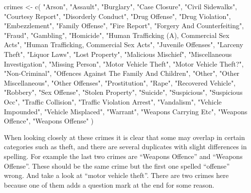\documentclass[
]{krantz}
\makeatletter
\newenvironment{Shaded}{\begin{snugshade}}{\end{snugshade}}
\newcommand{\FunctionTok}[1]{\textcolor[rgb]{0,0,0}{#1}}
\newcommand{\NormalTok}[1]{#1}
\newcommand{\OtherTok}[1]{\textcolor[rgb]{0.37,0.37,0.37}{#1}}
\newcommand{\StringTok}[1]{\textcolor[rgb]{0.5,0.5,0.5}{#1}}
\newenvironment{kframe}{%
\medskip{}
\setlength{\fboxsep}{.8em}
 \def\at@end@of@kframe{}%
 \ifinner\ifhmode%
  \def\at@end@of@kframe{\end{minipage}}%
  \begin{minipage}{\columnwidth}%
 \fi\fi%
 \def\FrameCommand##1{\hskip\@totalleftmargin \hskip-\fboxsep
 \colorbox{shadecolor}{##1}\hskip-\fboxsep
     \hskip-\linewidth \hskip-\@totalleftmargin \hskip\columnwidth}%
 \MakeFramed {\advance\hsize-\width
   \@totalleftmargin\z@ \linewidth\hsize
   \@setminipage}}%
 {\par\unskip\endMakeFramed%
 \at@end@of@kframe}
\renewenvironment{Shaded}{\begin{kframe}}{\end{kframe}}
\makeatother
\begin{document}
\begin{Shaded}
\begin{Highlighting}[]
\NormalTok{crimes }\OtherTok{\textless{}{-}} \FunctionTok{c}\NormalTok{(}
  \StringTok{"Arson"}\NormalTok{,}
  \StringTok{"Assault"}\NormalTok{,}
  \StringTok{"Burglary"}\NormalTok{,}
  \StringTok{"Case Closure"}\NormalTok{,}
  \StringTok{"Civil Sidewalks"}\NormalTok{,}
  \StringTok{"Courtesy Report"}\NormalTok{,}
  \StringTok{"Disorderly Conduct"}\NormalTok{,}
  \StringTok{"Drug Offense"}\NormalTok{,}
  \StringTok{"Drug Violation"}\NormalTok{,}
  \StringTok{"Embezzlement"}\NormalTok{,}
  \StringTok{"Family Offense"}\NormalTok{,}
  \StringTok{"Fire Report"}\NormalTok{,}
  \StringTok{"Forgery And Counterfeiting"}\NormalTok{,}
  \StringTok{"Fraud"}\NormalTok{,}
  \StringTok{"Gambling"}\NormalTok{,}
  \StringTok{"Homicide"}\NormalTok{,}
  \StringTok{"Human Trafficking (A), Commercial Sex Acts"}\NormalTok{,}
  \StringTok{"Human Trafficking, Commercial Sex Acts"}\NormalTok{,}
  \StringTok{"Juvenile Offenses"}\NormalTok{,}
  \StringTok{"Larceny Theft"}\NormalTok{,}
  \StringTok{"Liquor Laws"}\NormalTok{,}
  \StringTok{"Lost Property"}\NormalTok{,}
  \StringTok{"Malicious Mischief"}\NormalTok{,}
  \StringTok{"Miscellaneous Investigation"}\NormalTok{,}
  \StringTok{"Missing Person"}\NormalTok{,}
  \StringTok{"Motor Vehicle Theft"}\NormalTok{,}
  \StringTok{"Motor Vehicle Theft?"}\NormalTok{,}
  \StringTok{"Non{-}Criminal"}\NormalTok{,}
  \StringTok{"Offences Against The Family And Children"}\NormalTok{,}
  \StringTok{"Other"}\NormalTok{,}
  \StringTok{"Other Miscellaneous"}\NormalTok{,}
  \StringTok{"Other Offenses"}\NormalTok{,}
  \StringTok{"Prostitution"}\NormalTok{,}
  \StringTok{"Rape"}\NormalTok{,}
  \StringTok{"Recovered Vehicle"}\NormalTok{,}
  \StringTok{"Robbery"}\NormalTok{,}
  \StringTok{"Sex Offense"}\NormalTok{,}
  \StringTok{"Stolen Property"}\NormalTok{,}
  \StringTok{"Suicide"}\NormalTok{,}
  \StringTok{"Suspicious"}\NormalTok{,}
  \StringTok{"Suspicious Occ"}\NormalTok{,}
  \StringTok{"Traffic Collision"}\NormalTok{,}
  \StringTok{"Traffic Violation Arrest"}\NormalTok{,}
  \StringTok{"Vandalism"}\NormalTok{,}
  \StringTok{"Vehicle Impounded"}\NormalTok{,}
  \StringTok{"Vehicle Misplaced"}\NormalTok{,}
  \StringTok{"Warrant"}\NormalTok{,}
  \StringTok{"Weapons Carrying Etc"}\NormalTok{,}
  \StringTok{"Weapons Offence"}\NormalTok{,}
  \StringTok{"Weapons Offense"}
\NormalTok{)}
\end{Highlighting}
\end{Shaded}

When looking closely at these crimes it is clear that some
may overlap in certain categories such as theft, and there
are several duplicates with slight differences in spelling.
For example the last two crimes are ``Weapons Offence'' and
``Weapons Offense''. These should be the same crime but the
first one spelled ``offense'' wrong. And take a look at
``motor vehicle theft''. There are two crimes here because
one of them adds a question mark at the end for some reason.
\end{document}
